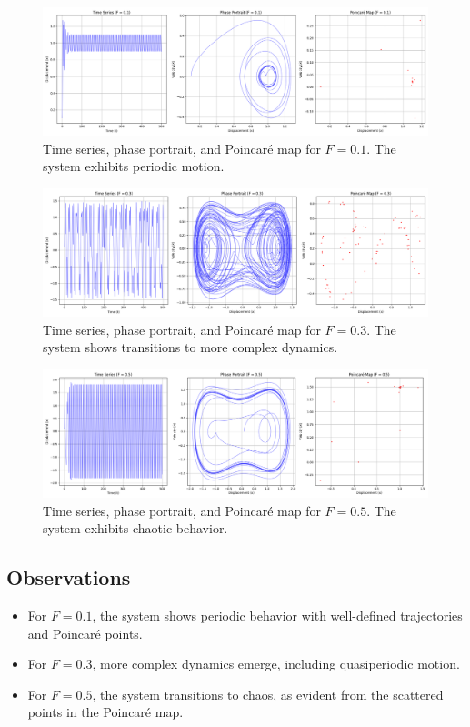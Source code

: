 \documentclass[11pt]{article}
\begin{document}
\begin{figure}[h!]
    \centering
    \includegraphics[width=\textwidth]{forcing_and_chaos_F_0.1.png}
    \caption{Time series, phase portrait, and Poincaré map for \(F = 0.1\). The system exhibits periodic motion.}
    \label{fig:forcing_chaos_F_0.1}
\end{figure}

\begin{figure}[h!]
    \centering
    \includegraphics[width=\textwidth]{forcing_and_chaos_F_0.3.png}
    \caption{Time series, phase portrait, and Poincaré map for \(F = 0.3\). The system shows transitions to more complex dynamics.}
    \label{fig:forcing_chaos_F_0.3}
\end{figure}

\begin{figure}[h!]
    \centering
    \includegraphics[width=\textwidth]{forcing_and_chaos_F_0.5.png}
    \caption{Time series, phase portrait, and Poincaré map for \(F = 0.5\). The system exhibits chaotic behavior.}
    \label{fig:forcing_chaos_F_0.5}
\end{figure}

\subsection*{Observations}
\begin{itemize}
    \item For \(F = 0.1\), the system shows periodic behavior with well-defined trajectories and Poincaré points.
    \item For \(F = 0.3\), more complex dynamics emerge, including quasiperiodic motion.
    \item For \(F = 0.5\), the system transitions to chaos, as evident from the scattered points in the Poincaré map.
\end{itemize}
\end{document}
